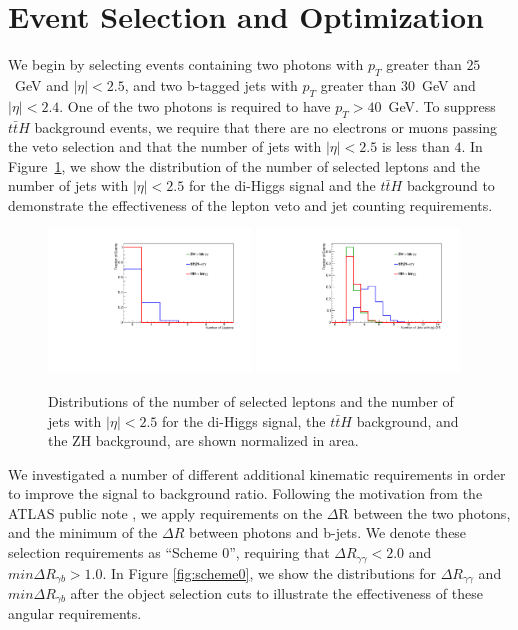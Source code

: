 \documentclass{cmspaper}
\begin{document}
\section{Event Selection and Optimization}
\label{sec:eventselection}
 
We begin by selecting events containing two photons with $p_{T}$ greater than $25$~GeV
and $|\eta|<2.5$, and two b-tagged jets with $p_{T}$ greater than $30$~GeV and $|\eta|<2.4$.
One of the two photons is required to have $p_{T} > 40$~GeV. To suppress $t\bar{t}H$ background
events, we require that there are no electrons or muons passing the veto selection and that 
the number of jets with $|\eta|<2.5$ is less than $4$. In Figure~\ref{fig:LeptonVetoAndJetCounting}, 
we show the distribution of the number of selected leptons and the number of jets with $|\eta|<2.5$ 
for the di-Higgs signal and the $t\bar{t}H$ background
to demonstrate the effectiveness of the lepton veto and jet counting requirements.

\begin{figure}[h]
\centering
\includegraphics[width=0.48\textwidth]{figures/NLeptons.pdf}	
\includegraphics[width=0.48\textwidth]{figures/Ncentraljets.pdf}	
\caption{Distributions of the number of selected leptons and the number of jets with $|\eta|<2.5$ for 
the di-Higgs signal, the $t\bar{t}H$ background, and the ZH background, are shown normalized in area.}
\label{fig:LeptonVetoAndJetCounting}
\end{figure}

We investigated a number of different additional kinematic requirements in order to improve the
signal to background ratio. Following the motivation from the ATLAS public note \cite{ATLASHHToBBGG},
we apply requirements on the $\Delta$R between the two photons, and the minimum of the 
$\Delta R$ between photons and b-jets. We denote these selection requirements as ``Scheme 0'', 
requiring that $\Delta R_{\gamma\gamma}<2.0$ and $min\Delta R_{\gamma b}>1.0$. 
In Figure \ref{fig:scheme0}, we show the distributions for $\Delta R_{\gamma\gamma}$ and $min\Delta R_{\gamma b}$ 
after the object selection cuts to illustrate the effectiveness of these angular requirements.
\end{document}
